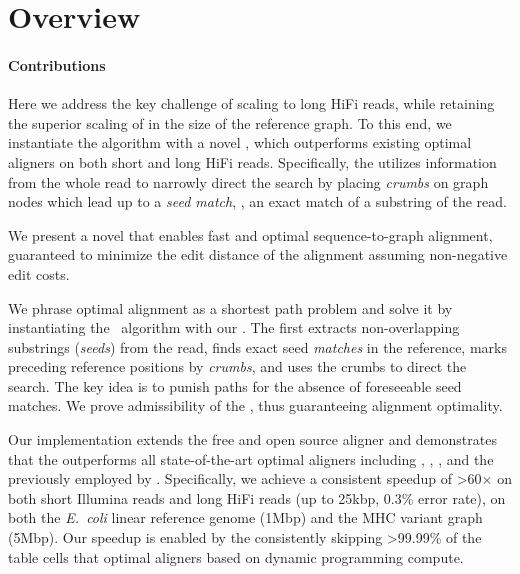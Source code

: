 \section{Overview}

\paragraph{Contributions}
Here we address the key challenge of scaling to long HiFi reads, while retaining
the superior scaling of \astarix in the size of the reference graph. To this
end, we instantiate the \A algorithm with a novel \sh, which outperforms
existing optimal aligners on both short and long HiFi reads. Specifically, the
\sh utilizes information from the whole read to narrowly direct the \A search
by placing \emph{crumbs} on graph nodes which lead up to a \emph{seed match},
\ie, an exact match of a substring of the read.

We present a novel \A \emph{\sh} that enables fast and optimal
sequence-to-graph alignment, guaranteed to minimize the edit distance of the
alignment assuming non-negative edit costs.

We phrase optimal alignment as a shortest path problem and solve it by
instantiating the \A~algorithm with our \sh. The \sh first extracts
non-overlapping substrings (\emph{seeds}) from the read, finds exact seed
\emph{matches} in the reference, marks preceding reference positions by
\emph{crumbs}, and uses the crumbs to direct the \A search. The key idea is to
punish paths for the absence of foreseeable seed matches. We prove admissibility
of the \sh, thus guaranteeing alignment optimality.

Our implementation extends the free and open source aligner and demonstrates
that the \sh outperforms all state-of-the-art optimal aligners including
\graphaligner, \vargas, \pasgal, and the \prefixh previously employed by
\astarix. Specifically, we achieve a consistent speedup of >60$\times$ on both
short Illumina reads and long HiFi reads (up to 25kbp, 0.3\% error rate), on
both the \textit{E.~coli} linear reference genome (1Mbp) and the MHC variant
graph (5Mbp). Our speedup is enabled by the \sh consistently skipping
>99.99\% of the table cells that optimal aligners based on dynamic programming
compute.


